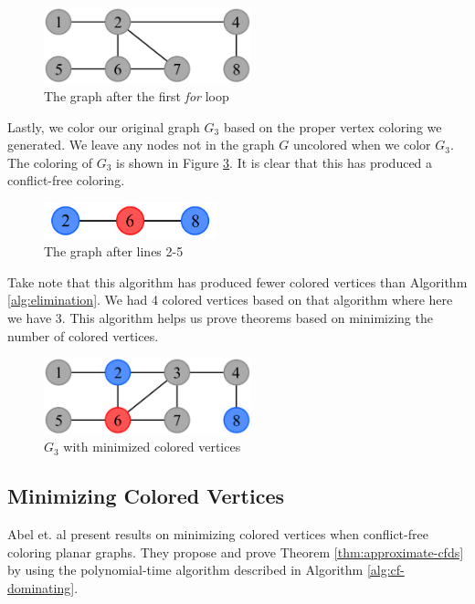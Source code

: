 \documentclass{sig-alternate}
\begin{document}
\begin{figure}[h]
	\centering
	\includegraphics[width=6cm]{../figures/algorithm2-step2.pdf}
	\caption{The graph after the first \emph{for} loop}\label{fig:algorithm2-step2}
\end{figure}

Lastly, we color our original graph $G_3$ based on the proper vertex coloring we generated. We leave any nodes not in the graph $G$ uncolored when we color $G_3$. The coloring of $G_3$ is shown in Figure \ref{fig:algorithm2-step4}. It is clear that this has produced a conflict-free coloring.

\begin{figure}[h]
	\centering
	\includegraphics[width=5cm]{../figures/algorithm2-step3.pdf}
	\caption{The graph after lines 2-5}\label{fig:algorithm2-step3}
\end{figure}

Take note that this algorithm has produced fewer colored vertices than Algorithm \ref{alg:elimination}. We had 4 colored vertices based on that algorithm where here we have 3. This algorithm helps us prove theorems based on minimizing the number of colored vertices.

\begin{figure}[h]
	\centering
	\includegraphics[width=6cm]{../figures/algorithm2-step4.pdf}
	\caption{$G_3$ with minimized colored vertices}\label{fig:algorithm2-step4}
\end{figure}

\vspace{-0.3cm}

\subsection{Minimizing Colored Vertices}
Abel et. al \cite{abel2017three} present results on minimizing colored vertices when conflict-free coloring planar graphs. They propose and prove Theorem \ref{thm:approximate-cfds} by using the polynomial-time algorithm described in Algorithm \ref{alg:cf-dominating}.
\end{document}
